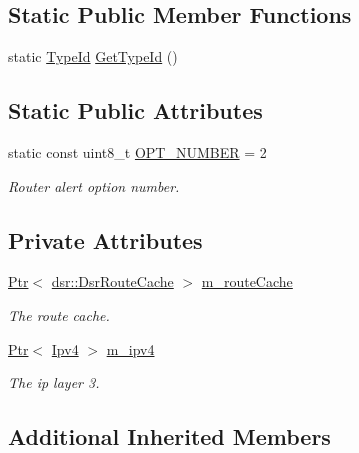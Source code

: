 \subsection*{Static Public Member Functions}
\begin{DoxyCompactItemize}
\item 
static \hyperlink{classns3_1_1TypeId}{Type\+Id} \hyperlink{classns3_1_1dsr_1_1DsrOptionRrep_ab9cae666e1efd949ce46cea71c177e04}{Get\+Type\+Id} ()
\end{DoxyCompactItemize}
\subsection*{Static Public Attributes}
\begin{DoxyCompactItemize}
\item 
static const uint8\+\_\+t \hyperlink{classns3_1_1dsr_1_1DsrOptionRrep_ab7202d71702f2935c407f57f95ccafcd}{O\+P\+T\+\_\+\+N\+U\+M\+B\+ER} = 2
\begin{DoxyCompactList}\small\item\em Router alert option number. \end{DoxyCompactList}\end{DoxyCompactItemize}
\subsection*{Private Attributes}
\begin{DoxyCompactItemize}
\item 
\hyperlink{classns3_1_1Ptr}{Ptr}$<$ \hyperlink{classns3_1_1dsr_1_1DsrRouteCache}{dsr\+::\+Dsr\+Route\+Cache} $>$ \hyperlink{classns3_1_1dsr_1_1DsrOptionRrep_ae289cef15b97d8b41f3cc8b9a5de4124}{m\+\_\+route\+Cache}
\begin{DoxyCompactList}\small\item\em The route cache. \end{DoxyCompactList}\item 
\hyperlink{classns3_1_1Ptr}{Ptr}$<$ \hyperlink{classns3_1_1Ipv4}{Ipv4} $>$ \hyperlink{classns3_1_1dsr_1_1DsrOptionRrep_a7cfa7876592c810a25f091478b65a2c4}{m\+\_\+ipv4}
\begin{DoxyCompactList}\small\item\em The ip layer 3. \end{DoxyCompactList}\end{DoxyCompactItemize}
\subsection*{Additional Inherited Members}


